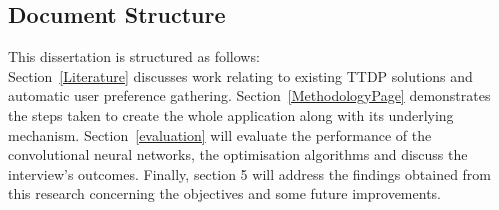 \subsection{Document Structure}

This dissertation is structured as follows: \\
Section~\ref{Literature} discusses work relating to existing TTDP
solutions and automatic user preference gathering.
Section~\ref{MethodologyPage} demonstrates the steps taken to create the
whole application along with its underlying mechanism.
Section~\ref{evaluation} will evaluate the performance of the
convolutional neural networks, the optimisation
algorithms and discuss the interview's outcomes.
Finally, section 5 will address the findings obtained
from this research concerning the objectives and some
future improvements.
